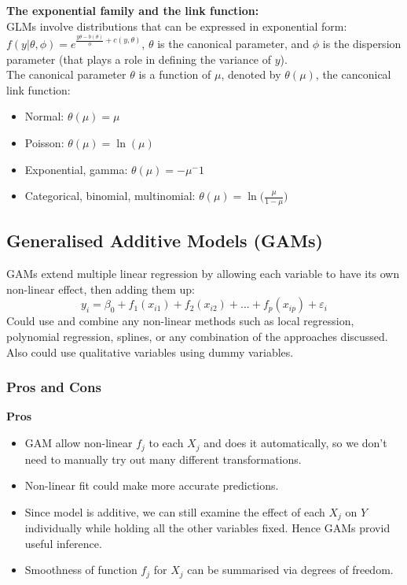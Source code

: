 \documentclass[11pt]{article}
\begin{document}
\noindent \textbf{The exponential family and the link function:} \\
\noindent GLMs involve distributions that can be expressed in exponential form: $f(y|\theta, \phi) = e^{\frac{y\theta - b(\theta)}{\phi} + c(y,\theta)}$, $\theta$ is the canonical parameter, and $\phi$ is the dispersion parameter (that plays a role in defining the variance of $y$). \\

\noindent The canonical parameter $\theta$ is a function of $\mu$, denoted by $\theta(\mu)$, the canconical link function:
\begin{itemize}
    \item Normal: $\theta(\mu) = \mu$
    \item Poisson: $\theta(\mu) = \ln(\mu)$
    \item Exponential, gamma: $\theta(\mu) = -\mu^-1$
    \item Categorical, binomial, multinomial: $\theta(\mu) = \ln\Big( \frac{\mu}{1-\mu} \Big)$
\end{itemize}

\subsection{Generalised Additive Models (GAMs)}
\noindent GAMs extend multiple linear regression by allowing each variable to have its own non-linear effect, then adding them up:
$$y_i = \beta_0 + f_1(x_{i1}) + f_2(x_{i2}) + ... + f_p(x_{ip}) + \varepsilon_i$$
\noindent Could use and combine any non-linear methods such as local regression, polynomial regression, splines, or any combination of the approaches discussed. Also could use qualitative variables using dummy variables.
\subsubsection{Pros and Cons}
\noindent \textbf{Pros}
\begin{itemize}
    \item GAM allow non-linear $f_j$ to each $X_j$ and does it automatically, so we don't need to manually try out many different transformations.
    \item Non-linear fit could make more accurate predictions.
    \item Since model is additive, we can still examine the effect of each $X_j$ on $Y$ individually while holding all the other variables fixed. Hence GAMs provid useful inference.
    \item Smoothness of function $f_j$ for $X_j$ can be summarised via degrees of freedom.
\end{itemize} \phantom{i}
\end{document}
